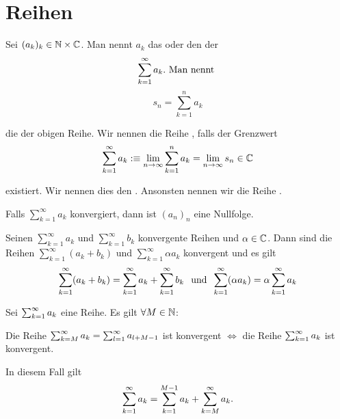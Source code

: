\section{Reihen}

\begin{mydef}
	Sei $(a_k)_k \in \mathbb{N} \times \mathbb{C}$. Man nennt $a_k$ das  oder den  der  
  \begin{equation}
		\sum_{k=1}^{\infty} a_k. $ Man nennt $
	\end{equation}
	\begin{equation}
		s_n=\sum_{k=1}^{n} a_k 
	\end{equation}
	
	die  der obigen Reihe. Wir nennen die Reihe , falls der Grenzwert
	\begin{equation}
		\sum_{k=1}^\infty a_k :\equiv \lim_{n \to \infty} \sum_{k=1}^{n} a_k = \lim_{n \to \infty} s_n \in \mathbb{C}
	\end{equation}
	
	existiert. Wir nennen dies den . Ansonsten nennen wir die Reihe .
\end{mydef}

\begin{thm}
	Falls $\sum_{k=1}^{\infty} a_k$ konvergiert, dann ist $(a_n)_n$ eine Nullfolge.
\end{thm}

\setcounter{thm}{5}
\begin{thm}[Linearität]
	Seinen $\sum_{k=1}^{\infty} a_k$ und $\sum_{k=1}^{\infty} b_k$ konvergente Reihen und $\alpha \in \mathbb{C}$. Dann sind die Reihen  $\sum_{k=1}^{\infty} (a_k + b_k)$ und $\sum_{k=1}^{\infty} \alpha a_k$ konvergent und es gilt
	\begin{equation}
		\sum_{k=1}^{\infty} (a_k + b_k) = \sum_{k=1}^{\infty} a_k + \sum_{k=1}^{\infty} b_k \;\;\, \text{und}\;\; \sum_{k=1}^{\infty} (\alpha a_k) = \alpha \sum_{k=1}^{\infty} a_k
	\end{equation}
\end{thm}

\setcounter{thm}{7}
\begin{thm}
	Sei $\sum_{k=1}^{\infty} a_k$ eine Reihe. Es gilt $\forall M \in \mathbb{N}$:
	
	Die Reihe $\sum_{k=M}^{\infty} a_k = \sum_{l=1}^{\infty} a_{l+M-1}$ ist konvergent $\iff$ die Reihe $\sum_{k=1}^{\infty} a_k$ ist konvergent.
	
	In diesem Fall gilt
	\begin{equation}
		\sum_{k=1}^{\infty} a_k = \sum_{k=1}^{M-1} a_k + \sum_{k=M}^{\infty} a_k.
	\end{equation}
\end{thm}

